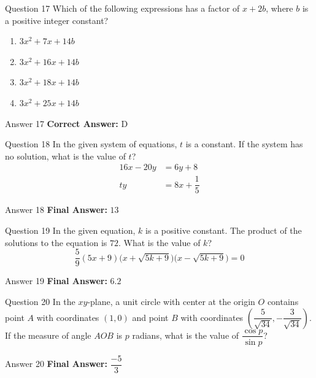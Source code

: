 \documentclass{beamer}
\begin{document}
\begin{frame}{Question 17}
\small
Which of the following expressions has a factor of \(x + 2b\), where \(b\) is a positive integer constant?
\vspace{0.35cm}
\begin{enumerate}
    \item[A.] \(3x^{2} + 7x + 14b\)
    \item[B.] \(3x^{2} + 16x + 14b\)
    \item[C.] \(3x^{2} + 18x + 14b\)
    \item[D.] \(3x^{2} + 25x + 14b\)
\end{enumerate}
\end{frame}
\begin{frame}{Answer 17}
\small
\textbf{Correct Answer:} D
\end{frame}

\begin{frame}{Question 18}
\small
In the given system of equations, \(t\) is a constant. If the system has no solution, what is the value of \(t\)?
\[
\begin{aligned}
16x - 20y &= 6y + 8 \\
ty &= 8x + \dfrac{1}{5}
\end{aligned}
\]
\end{frame}
\begin{frame}{Answer 18}
\small
\textbf{Final Answer:} $\boxed{13}$
\end{frame}

\begin{frame}{Question 19}
\small
In the given equation, \(k\) is a positive constant. The product of the solutions to the equation is \(72\). What is the value of \(k\)?
\[
\dfrac{5}{9}(5x + 9)\bigl(x + \sqrt{5k + 9}\bigr)\bigl(x - \sqrt{5k + 9}\bigr) = 0
\]
\end{frame}
\begin{frame}{Answer 19}
\small
\textbf{Final Answer:} $\boxed{6.2}$
\end{frame}

\begin{frame}{Question 20}
\small
In the \(xy\)-plane, a unit circle with center at the origin \(O\) contains point \(A\) with coordinates \((1, 0)\) and point \(B\) with coordinates \(\left(\dfrac{5}{\sqrt{34}}, -\dfrac{3}{\sqrt{34}}\right)\). If the measure of angle \(AOB\) is \(p\) radians, what is the value of \(\dfrac{\cos p}{\sin p}\)?
\end{frame}
\begin{frame}{Answer 20}
\small
\textbf{Final Answer:} $\boxed{\dfrac{-5}{3}}$
\end{frame}
\end{document}
